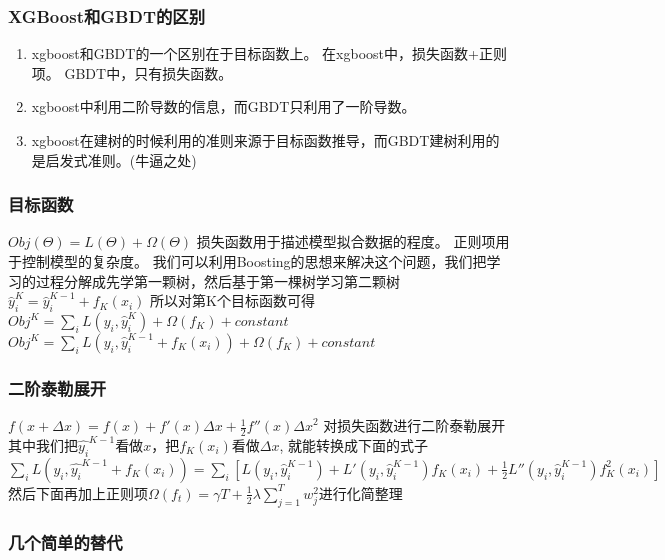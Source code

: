 \documentclass[11pt]{article}
\providecommand{\tightlist}{%
      \setlength{\itemsep}{0pt}\setlength{\parskip}{0pt}}
\begin{document}
    \subsubsection{XGBoost和GBDT的区别}\label{xgboostux548cgbdtux7684ux533aux522b}

\begin{enumerate}
\def\labelenumi{\arabic{enumi}.}
\tightlist
\item
  xgboost和GBDT的一个区别在于目标函数上。 在xgboost中，损失函数+正则项。
  GBDT中，只有损失函数。
\item
  xgboost中利用二阶导数的信息，而GBDT只利用了一阶导数。
\item
  xgboost在建树的时候利用的准则来源于目标函数推导，而GBDT建树利用的是启发式准则。(牛逼之处)
\end{enumerate}

    \subsubsection{目标函数}\label{ux76eeux6807ux51fdux6570}

\(Obj(\Theta)=L(\Theta)+\Omega(\Theta)\)
损失函数用于描述模型拟合数据的程度。 正则项用于控制模型的复杂度。
我们可以利用Boosting的思想来解决这个问题，我们把学习的过程分解成先学第一颗树，然后基于第一棵树学习第二颗树
\(\hat{y}_i^K=\hat{y}_i^{K-1}+f_K(x_i)\) 所以对第K个目标函数可得
\(Obj^K=\sum_iL(y_i,\hat{y}_i^K)+\Omega(f_K)+constant\)
\(Obj^K=\sum_iL\left(y_i,\hat{y}_i^{K-1}+f_K(x_i)\right)+\Omega(f_K)+constant\)

    \subsubsection{二阶泰勒展开}\label{ux4e8cux9636ux6cf0ux52d2ux5c55ux5f00}

\(f(x+\Delta x)=f(x)+f'(x)\Delta x+\frac{1}{2}f''(x){\Delta x}^2\)
对损失函数进行二阶泰勒展开
其中我们把\(\hat{y_i}^{K-1}\)看做\(x\)，把\(f_K(x_i)\)看做\(\Delta x\),
就能转换成下面的式子
\(\sum_iL\left(y_i,\hat{y_i}^{K-1}+f_K(x_i)\right)=\sum_i\left[L(y_i,\hat{y}_i^{K-1})+L'(y_i,\hat{y}_i^{K-1})f_K(x_i)+\frac{1}{2}L''(y_i,\hat{y}_i^{K-1})f_K^2(x_i)\right]\)
然后下面再加上正则项\(\Omega(f_t) = \gamma T + \frac 1 2 \lambda \sum_{j = 1}^T w_j^2\)进行化简整理

    \subsubsection{几个简单的替代}\label{ux51e0ux4e2aux7b80ux5355ux7684ux66ffux4ee3}
\end{document}
